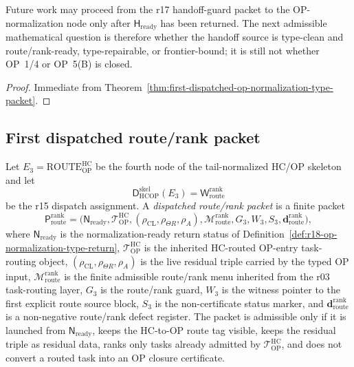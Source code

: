 \begin{corollary}
\label{cor:v3340-r18-working-rule}
Future work may proceed from the r17 handoff-guard packet to the OP-normalization node only after \(\mathsf H_{\mathrm{ready}}\) has been returned.  The next admissible mathematical question is therefore whether the handoff source is type-clean and route/rank-ready, type-repairable, or frontier-bound; it is still not whether OP~1/4 or OP~5(B) is closed.
\end{corollary}

\begin{proof}
Immediate from Theorem~\ref{thm:first-dispatched-op-normalization-type-packet}.
\end{proof}
\subsection{First dispatched route/rank packet}
\label{subsec:first-dispatched-route-rank-packet}

\begin{definition}
\label{def:dispatched-route-rank-packet}
Let \(E_3=\mathrm{ROUTE}_{\mathrm{OP}}^{\mathrm{HC}}\) be the fourth node of the tail-normalized HC/OP skeleton and let
\[
  \mathsf D_{\mathrm{HCOP}}^{\mathrm{skel}}(E_3)
  =
  \mathsf W_{\mathrm{route}}^{\mathrm{rank}}
\]
be the r15 dispatch assignment.  A \emph{dispatched route/rank packet} is a finite packet
\[
  \mathsf P_{\mathrm{route}}^{\mathrm{rank}}
  =
  \bigl(\mathsf N_{\mathrm{ready}},\mathcal T_{\mathrm{OP}}^{\mathrm{HC}},
        (\rho_{\mathrm{CL}},\rho_{\Theta R},\rho_A),
        \mathcal M_{\mathrm{route}}^{\mathrm{rank}},G_3,W_3,S_3,
        \mathbf d_{\mathrm{route}}^{\mathrm{rank}}\bigr),
\]
where \(\mathsf N_{\mathrm{ready}}\) is the normalization-ready return status of Definition~\ref{def:r18-op-normalization-type-return}, \(\mathcal T_{\mathrm{OP}}^{\mathrm{HC}}\) is the inherited HC-routed OP-entry task-routing object, \((\rho_{\mathrm{CL}},\rho_{\Theta R},\rho_A)\) is the live residual triple carried by the typed OP input, \(\mathcal M_{\mathrm{route}}^{\mathrm{rank}}\) is the finite admissible route/rank menu inherited from the r03 task-routing layer, \(G_3\) is the route/rank guard, \(W_3\) is the witness pointer to the first explicit route source block, \(S_3\) is the non-certificate status marker, and \(\mathbf d_{\mathrm{route}}^{\mathrm{rank}}\) is a non-negative route/rank defect register.  The packet is admissible only if it is launched from \(\mathsf N_{\mathrm{ready}}\), keeps the HC-to-OP route tag visible, keeps the residual triple as residual data, ranks only tasks already admitted by \(\mathcal T_{\mathrm{OP}}^{\mathrm{HC}}\), and does not convert a routed task into an OP closure certificate.
\end{definition}

